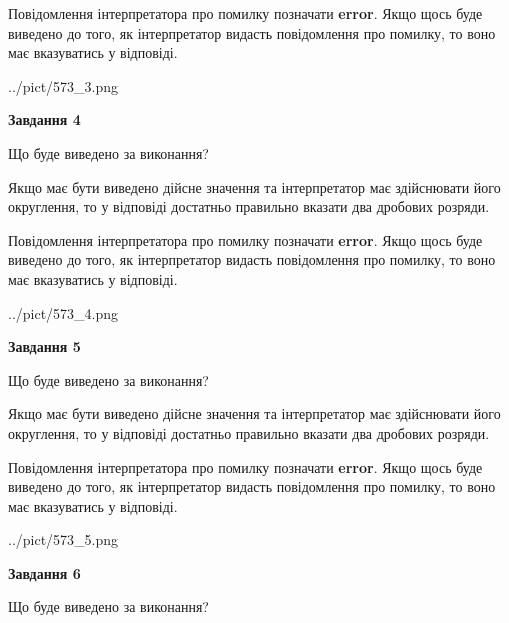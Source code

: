 \documentclass[12pt, ukrainian]{article}
\begin{document}
{\begin {Large}
Повідомлення інтерпретатора про помилку позначати \textbf{error}.
Якщо щось буде виведено до того, як інтерпретатор видасть повідомлення про помилку, 
то воно має вказуватись у відповіді. \par

\begin{center}
	{../pict/573_3.png}
\end{center}
\newpage

{\begin {center}\textbf{Завдання 4}\end {center}}\par
Що буде виведено за виконання? \par

Якщо має бути виведено дійсне значення та інтерпретатор має здійснювати його округлення, 
то у відповіді достатньо правильно вказати два дробових розряди.

Повідомлення інтерпретатора про помилку позначати \textbf{error}.
Якщо щось буде виведено до того, як інтерпретатор видасть повідомлення про помилку, 
то воно має вказуватись у відповіді. \par

\begin{center}
	{../pict/573_4.png}
\end{center}
\newpage

{\begin {center}\textbf{Завдання 5}\end {center}}\par
Що буде виведено за виконання? \par

Якщо має бути виведено дійсне значення та інтерпретатор має здійснювати його округлення, 
то у відповіді достатньо правильно вказати два дробових розряди.

Повідомлення інтерпретатора про помилку позначати \textbf{error}.
Якщо щось буде виведено до того, як інтерпретатор видасть повідомлення про помилку, 
то воно має вказуватись у відповіді. \par

\begin{center}
	{../pict/573_5.png}
\end{center}
\newpage

{\begin {center}\textbf{Завдання 6}\end {center}}\par
Що буде виведено за виконання? \par


\end{Large}}
\end{document}
